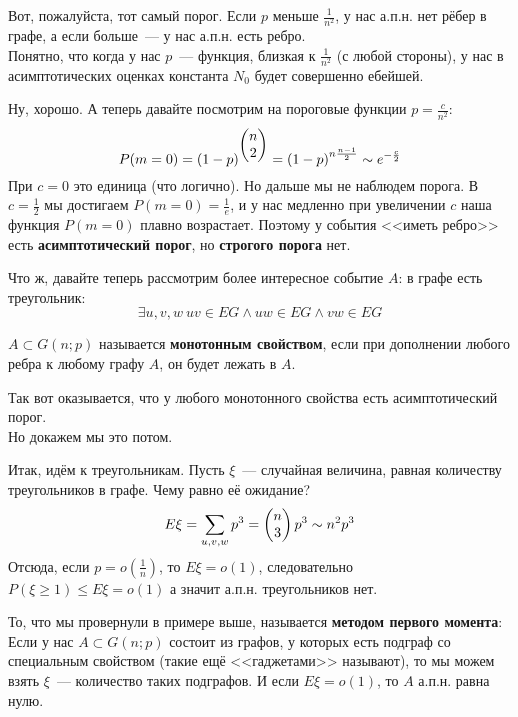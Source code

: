 \documentclass{article}
\begin{document}
    \begin{remark}
        Вот, пожалуйста, тот самый порог. Если $p$ меньше $\frac1{n^2}$, у нас а.п.н. нет рёбер в графе, а если больше~--- у нас а.п.н. есть ребро.\\
        Понятно, что когда у нас $p$~--- функция, близкая к $\frac1{n^2}$ (с любой стороны), у нас в асимптотических оценках константа $N_0$ будет совершенно ебейшей.
    \end{remark}
    \begin{example}
        Ну, хорошо. А теперь давайте посмотрим на пороговые функции $p=\frac c{n^2}$:
        $$
        P(m=0)=\left(1-p\right)^{\left(\begin{matrix}n\\2\end{matrix}\right)}=\left(1-p\right)^{n\frac{n-1}2}\sim e^{-\frac c2}
        $$
        При $c=0$ это единица (что логично). Но дальше мы не наблюдем порога. В $c=\frac12$ мы достигаем $P(m=0)=\frac1e$, и у нас медленно при увеличении $c$ наша функция $P(m=0)$ плавно возрастает. Поэтому у события <<иметь ребро>> есть \textbf{асимптотический порог}, но \textbf{строгого порога} нет.
    \end{example}
    \begin{example}
        Что ж, давайте теперь рассмотрим более интересное событие $A$: в графе есть треугольник:
        $$
        \exists u,v,w~uv\in EG\land uw\in EG\land vw\in EG
        $$
    \end{example}
    \begin{definition}
        $A\subset G(n;p)$ называется \textbf{монотонным свойством}, если при дополнении любого ребра к любому графу $A$, он будет лежать в $A$.
    \end{definition}
    \begin{claim}
        Так вот оказывается, что у любого монотонного свойства есть асимптотический порог.\\
        Но докажем мы это потом.
    \end{claim}
    \begin{example}
        Итак, идём к треугольникам. Пусть $\xi$~--- случайная величина, равная количеству треугольников в графе. Чему равно её ожидание?
        $$
        E\xi=\sum\limits_{u,v,w}p^3=\left(\begin{matrix}n\\3\end{matrix}\right)p^3\sim n^2p^3
        $$
        Отсюда, если $p=o\left(\frac1n\right)$, то $E\xi=o(1)$, следовательно $P(\xi\geqslant1)\leqslant E\xi=o(1)$ а значит а.п.н. треугольников нет.
    \end{example}
    \begin{remark}
        То, что мы провернули в примере выше, называется \textbf{методом первого момента}:\\
        Если у нас $A\subset G(n;p)$ состоит из графов, у которых есть подграф со специальным свойством (такие ещё <<гаджетами>> называют), то мы можем взять $\xi$~--- количество таких подграфов. И если $E\xi=o(1)$, то $A$ а.п.н. равна нулю.
    \end{remark}
\end{document}
